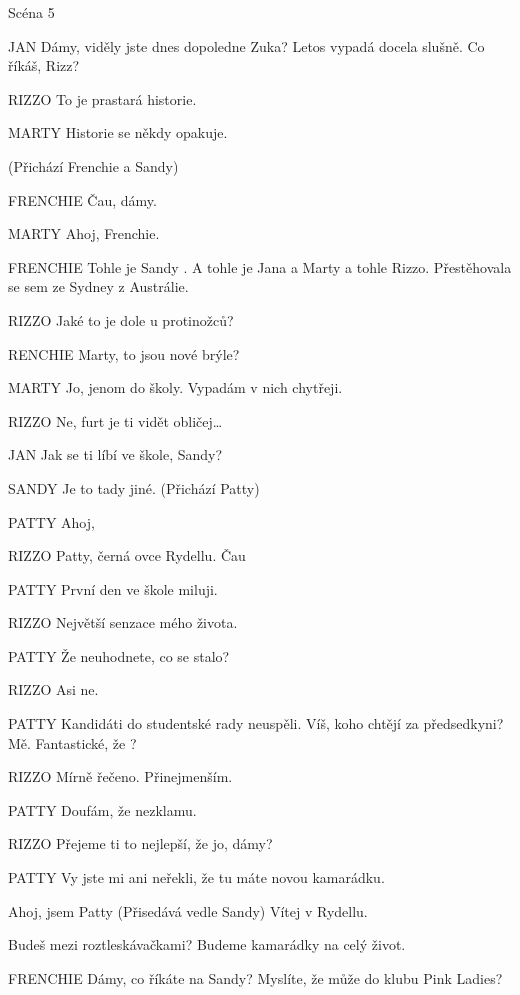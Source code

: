                                 

Scéna 5 

JAN        Dámy, viděly jste dnes dopoledne Zuka? Letos vypadá docela slušně.         Co říkáš, Rizz?

RIZZO        To je prastará historie.

MARTY        Historie se někdy opakuje.

        (Přichází Frenchie a Sandy)

FRENCHIE        Čau, dámy.

MARTY        Ahoj, Frenchie.

FRENCHIE        Tohle je Sandy . A tohle je Jana a Marty a tohle Rizzo. Přestěhovala se         sem ze Sydney z Austrálie.

RIZZO        Jaké to je dole u protinožců?

RENCHIE        Marty, to jsou nové brýle?

MARTY        Jo, jenom do školy. Vypadám v nich chytřeji.

RIZZO        Ne, furt je ti vidět obličej…

JAN        Jak se ti líbí ve škole, Sandy?

SANDY        Je to tady jiné. (Přichází Patty)

PATTY        Ahoj, 

RIZZO        Patty, černá ovce Rydellu. Čau

PATTY        První den ve škole miluji.

RIZZO        Největší senzace mého života.

PATTY        Že neuhodnete, co se stalo?

RIZZO        Asi ne.

PATTY        Kandidáti do studentské rady neuspěli. Víš, koho chtějí za                         předsedkyni? Mě. Fantastické, že ?

RIZZO        Mírně řečeno. Přinejmenším.

PATTY        Doufám, že nezklamu.

RIZZO        Přejeme ti to nejlepší, že jo, dámy?

PATTY        Vy jste mi ani neřekli, že tu máte novou kamarádku.

                Ahoj, jsem Patty (Přisedává vedle Sandy) Vítej v Rydellu.

                Budeš mezi roztleskávačkami? Budeme kamarádky na celý život.

FRENCHIE        Dámy, co říkáte na Sandy? Myslíte, že může do klubu Pink Ladies?

